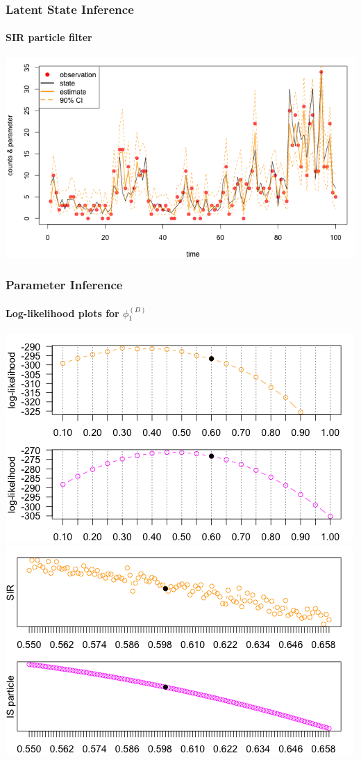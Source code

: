 \documentclass[11pt]{beamer}
\begin{document}
\begin{frame}
\frametitle{Latent State Inference}
\framesubtitle{SIR particle filter}
\centering
\includegraphics[scale=0.45]{hdpm-est}
\end{frame}

\begin{frame}
\frametitle{Parameter Inference}
\framesubtitle{Log-likelihood plots for $\phi_1^{(D)}$}
\centering
\includegraphics[scale=0.30]{hdpm-loglik-Dphi1}
\includegraphics[scale=0.30]{hdpm-loglik-Dphi1-zoom}
\end{frame}
\end{document}
